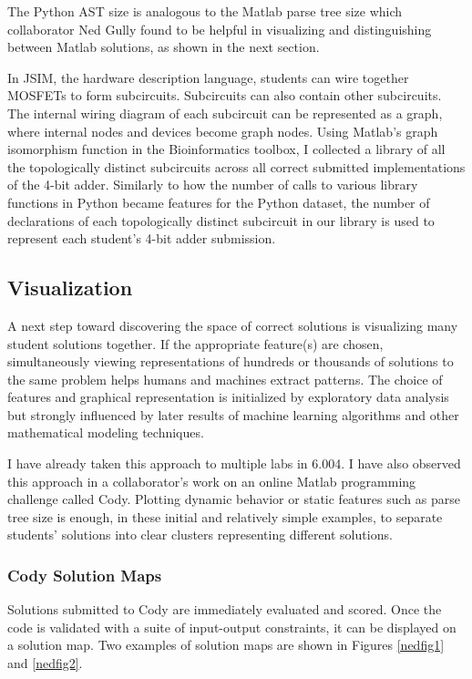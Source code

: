 \documentclass[12pt]{article}
\begin{document}
The Python AST size is analogous to the Matlab parse tree size which collaborator Ned Gully found to be helpful in visualizing and distinguishing between Matlab solutions, as shown in the next section.

In JSIM, the hardware description language, students can wire together MOSFETs to form subcircuits. Subcircuits can also contain other subcircuits. The internal wiring diagram of each subcircuit can be represented as a graph, where internal nodes and devices become graph nodes. Using Matlab's graph isomorphism function in the Bioinformatics toolbox, I collected a library of all the topologically distinct subcircuits across all correct submitted implementations of the 4-bit adder. Similarly to how the number of calls to various library functions in Python became features for the Python dataset, the number of declarations of each topologically distinct subcircuit in our library is used to represent each student's 4-bit adder submission.


\subsection{Visualization}

A next step toward discovering the space of correct solutions is visualizing many student solutions together. If the appropriate feature(s) are chosen, simultaneously viewing representations of hundreds or thousands of solutions to the same problem helps humans and machines extract patterns. The choice of features and graphical representation is initialized by exploratory data analysis but strongly influenced by later results of machine learning algorithms and other mathematical modeling techniques. 

I have already taken this approach to multiple labs in 6.004. I have also observed this approach in a collaborator's work on an online Matlab programming challenge called Cody. Plotting dynamic behavior or static features such as parse tree size is enough, in these initial and relatively simple examples, to separate students' solutions into clear clusters representing different solutions. %

\subsubsection{Cody Solution Maps}
Solutions submitted to Cody are immediately evaluated and scored. Once the code is validated with a suite of input-output constraints, it can be displayed on a solution map. Two examples of solution maps are shown in Figures \ref{nedfig1} and \ref{nedfig2}. 
 
\end{document}
